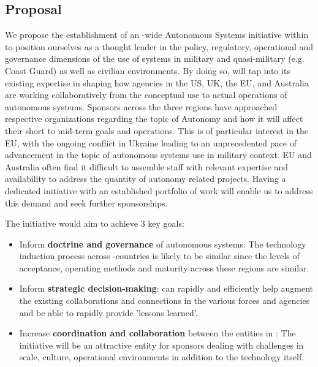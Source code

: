 \documentclass[11pt,letterpaper]{article}
\begin{document}
\subsection{Proposal}

We propose the establishment of an \auke-wide Autonomous Systems
initiative within \org to position ourselves as a thought leader in
the policy, regulatory, operational and governance dimensions of the
use of systems in military and quasi-military (e.g. Coast Guard) as
well as civilian environments. By doing so, \org will tap into its
existing expertise in shaping how agencies in the US, UK, the EU, and
Australia are working collaboratively from the conceptual use to
actual operations of autonomous systems. Sponsors across the three
regions have approached respective \org organizations regarding the
topic of Autonomy and how it will affect their short to mid-term goals
and operations. This is of particular interest in the EU, with the
ongoing conflict in Ukraine leading to an unprecedented pace of
advancement in the topic of autonomous systems use in military
context. \org EU and Australia often find it difficult to assemble
staff with relevant expertise and availability to address the quantity
of autonomy related projects. Having a dedicated initiative with an
established portfolio of work will enable us to address this demand
and seek further sponsorships.

The initiative would aim to achieve 3 key goals: 

\begin{itemize}

\item Inform \textbf{doctrine and governance} of autonomous systems:
  The technology induction process across \auke-countries is likely to
  be similar since the levels of acceptance, operating methods and
  maturity across these regions are similar.

\item Inform \textbf{strategic decision-making}: \org can rapidly and
  efficiently help augment the existing collaborations and connections
  in the various forces and agencies and be able to rapidly provide
  ’lessons learned’.

\item Increase \textbf{coordination and collaboration} between the
  entities in \auke: The initiative will be an attractive entity for
  sponsors dealing with challenges in scale, culture, operational
  environments in addition to the technology itself.

\end{itemize}
\end{document}
